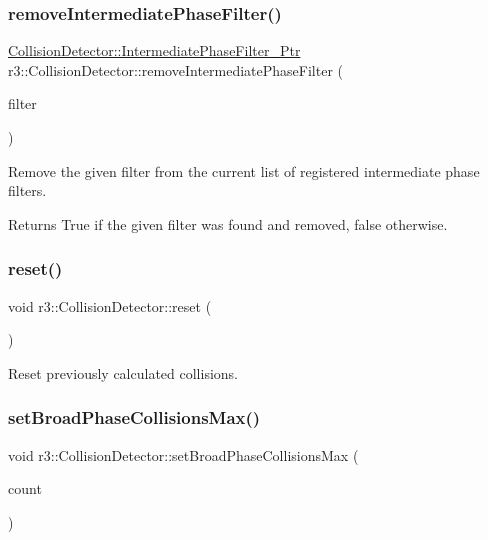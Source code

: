 \subsubsection{\texorpdfstring{remove\+Intermediate\+Phase\+Filter()}{removeIntermediatePhaseFilter()}}
{\footnotesize\ttfamily \mbox{\hyperlink{classr3_1_1_collision_detector_a8337c2c23ec77350b65977e043c07827}{Collision\+Detector\+::\+Intermediate\+Phase\+Filter\+\_\+\+Ptr}} r3\+::\+Collision\+Detector\+::remove\+Intermediate\+Phase\+Filter (\begin{DoxyParamCaption}\item[{\mbox{\hyperlink{classr3_1_1_i_intermediate_phase_filter}{I\+Intermediate\+Phase\+Filter}} $\ast$}]{filter }\end{DoxyParamCaption})}

Remove the given filter from the current list of registered intermediate phase filters. \begin{DoxyReturn}{Returns}
True if the given filter was found and removed, false otherwise. 
\end{DoxyReturn}
\mbox{\label{classr3_1_1_collision_detector_a8f9f9e0ecc67d950e79d024803dc916b}} 
\subsubsection{\texorpdfstring{reset()}{reset()}}
{\footnotesize\ttfamily void r3\+::\+Collision\+Detector\+::reset (\begin{DoxyParamCaption}{ }\end{DoxyParamCaption})}

Reset previously calculated collisions. \mbox{\label{classr3_1_1_collision_detector_a386e4e4027a98c154423c8aea9079138}} 
\subsubsection{\texorpdfstring{set\+Broad\+Phase\+Collisions\+Max()}{setBroadPhaseCollisionsMax()}}
{\footnotesize\ttfamily void r3\+::\+Collision\+Detector\+::set\+Broad\+Phase\+Collisions\+Max (\begin{DoxyParamCaption}\item[{int}]{count }\end{DoxyParamCaption})}

